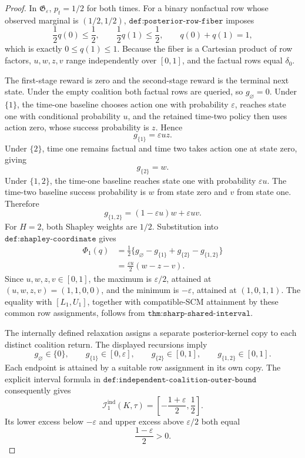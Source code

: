 \documentclass{article}
\begin{document}
\begin{proof}
In \(\mathfrak G_\varepsilon\), \(p_t=1/2\) for both times.  For a binary nonfactual row whose observed marginal is \((1/2,1/2)\), \(\texttt{def:posterior-row-fiber}\) imposes
\[
 \frac12q(0)\le\frac12,
 \qquad
 \frac12q(1)\le\frac12,
 \qquad
 q(0)+q(1)=1,
\]
which is exactly \(0\le q(1)\le1\).  Because the fiber is a Cartesian product of row factors, \(u,w,z,v\) range independently over \([0,1]\), and the factual rows equal \(\delta_0\).

The first-stage reward is zero and the second-stage reward is the terminal next state.  Under the empty coalition both factual rows are queried, so \(g_\varnothing=0\).  Under \(\{1\}\), the time-one baseline chooses action one with probability \(\varepsilon\), reaches state one with conditional probability \(u\), and the retained time-two policy then uses action zero, whose success probability is \(z\).  Hence
\[
 g_{\{1\}}=\varepsilon uz.
\]
Under \(\{2\}\), time one remains factual and time two takes action one at state zero, giving
\[
 g_{\{2\}}=w.
\]
Under \(\{1,2\}\), the time-one baseline reaches state one with probability \(\varepsilon u\).  The time-two baseline success probability is \(w\) from state zero and \(v\) from state one.  Therefore
\[
 g_{\{1,2\}}=(1-\varepsilon u)w+\varepsilon uv.
\]
For \(H=2\), both Shapley weights are \(1/2\).  Substitution into \(\texttt{def:shapley-coordinate}\) gives
\[
\begin{aligned}
 \Phi_1(q)
 &=\frac12\{g_\varnothing-g_{\{1\}}+g_{\{2\}}-g_{\{1,2\}}\}\\
 &=\frac{\varepsilon u}{2}(w-z-v).
\end{aligned}
\]
Since \(u,w,z,v\in[0,1]\), the maximum is \(\varepsilon/2\), attained at \((u,w,z,v)=(1,1,0,0)\), and the minimum is \(-\varepsilon\), attained at \((1,0,1,1)\).  The equality with \([L_1,U_1]\), together with compatible-SCM attainment by these common row assignments, follows from \(\texttt{thm:sharp-shared-interval}\).

The internally defined relaxation assigns a separate posterior-kernel copy to each distinct coalition return.  The displayed recursions imply
\[
 g_\varnothing\in\{0\},
 \qquad
 g_{\{1\}}\in[0,\varepsilon],
 \qquad
 g_{\{2\}}\in[0,1],
 \qquad
 g_{\{1,2\}}\in[0,1].
\]
Each endpoint is attained by a suitable row assignment in its own copy.  The explicit interval formula in \(\texttt{def:independent-coalition-outer-bound}\) consequently gives
\[
 \mathcal I_1^{\mathrm{ind}}(K,\tau)
 =\left[-\frac{1+\varepsilon}{2},\frac12\right].
\]
Its lower excess below \(-\varepsilon\) and upper excess above \(\varepsilon/2\) both equal
\[
 \frac{1-\varepsilon}{2}>0.
\]


\end{proof}
\end{document}
